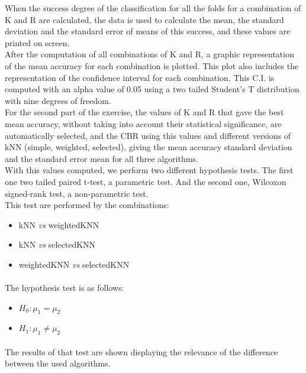 \documentclass[12pt, a4paper]{article}
\begin{document}
When the success degree of the classification for all the folds for a combination of K and R are calculated, the data is used to calculate the mean, the standard deviation and the standard error of means of this success, and these values are printed on screen.\\

After the computation of all combinations of K and R, a graphic representation of the mean accuracy for each combination is plotted. This plot also includes the representation of the confidence interval for each combination. This C.I. is computed with an alpha value of 0.05 using a two tailed Student’s T distribution with nine degrees of freedom.\\

For the second part of the exercise, the values of K and R that gave the best mean accuracy, without taking into account their statistical significance, are automatically selected, and the CBR using this values and different versions of kNN (simple, weighted, selected), giving the mean accuracy standard deviation and the standard error mean for all three algorithms.\\

With this values computed, we perform two different hypothesis tests. The first one two tailed paired t-test, a parametric test. And the second one, Wilcoxon signed-rank test, a non-parametric test.\\

This test are performed by the combinations:
\begin{itemize}
	\item kNN \emph{vs} weightedKNN
	\item kNN \emph{vs} selectedKNN
	\item weightedKNN \emph{vs} selectedKNN
\end{itemize}

\paragraph{}The hypothesis test is as follows:
\begin{itemize}
	\item $H_0: \mu_1 = \mu_2$
	\item $H_1: \mu_1 \neq \mu_2$
\end{itemize}
\paragraph{}The results of that test are shown displaying the relevance of the difference between the used algorithms.
\end{document}
